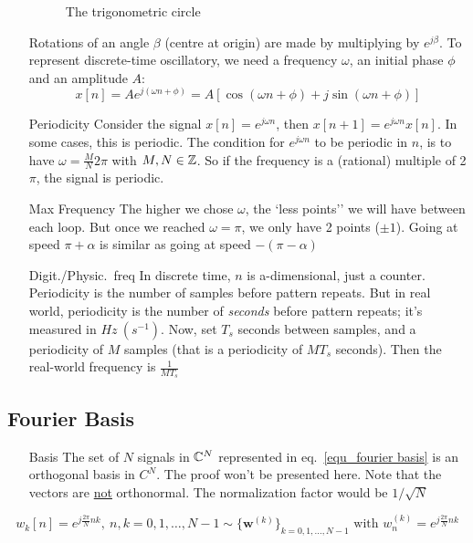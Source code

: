 \documentclass[11pt,a4paper]{article}
\begin{document}
\begin{itemize}
\begin{figure}
            \caption{The trigonometric circle}%
            \label{fig_trigo circle}
        \end{figure}
        Rotations of an angle $\beta$ (centre at origin) are made by multiplying by $e^{j\beta}$. To represent discrete-time oscillatory, we need a frequency $\omega$, an initial phase $\phi$ and an amplitude $A$:
        \[x[n] = Ae^{j(\omega n + \phi)} = A[\cos(\omega n + \phi) + j\sin(\omega n+ \phi)]\]
    \item[Periodicity] Consider the signal $x[n] = e^{j\omega n}$, then $x[n+1] = e^{j\omega n} x[n]$. In some cases, this is periodic. The condition for $e^{j\omega n}$ to be periodic in $n$, is to have $\omega = \frac{M}{N}2\pi$ with $M,N \in \mathbb{Z}$. So if the frequency is a (rational) multiple of 2$\pi$, the signal is periodic.
    \item[Max Frequency]The higher we chose $\omega$, the `less points'' we will have between each loop. But once we reached $\omega = \pi$, we only have 2 points ($\pm 1$). Going at speed $\pi+\alpha$ is similar as going at speed $-(\pi-\alpha)$
    \item[Digit./Physic.\ freq]In discrete time, $n$ is a-dimensional, just a counter. Periodicity is the number of samples before pattern repeats. But in real world, periodicity is the number of \textit{seconds} before pattern repeats; it's measured in $Hz\ (s^{-1})$. Now, set $T_s$ seconds between samples, and a periodicity of $M$ samples (that is a periodicity of $MT_s$ seconds). Then the real-world frequency is $\frac{1}{MT_s}$
\end{itemize}
\subsection{Fourier Basis}
\begin{itemize}
    \item[Basis]The set of $N$ signals in $\mathbb{C}^N$ represented in eq.~\ref{equ_fourier basis} is an orthogonal basis in $C^N$. The proof won't be presented here. Note that the vectors are \uline{not} orthonormal. The normalization factor would be $1/\sqrt{N}$
\end{itemize}        
\begin{equation}
    w_k[n] = e^{j\frac{2\pi}{N}nk},\ n,k = 0,1,\ldots,N-1 \sim \{\mathbf{w}^{(k)}\}_{k=0,1,\ldots,N-1} \text{ with } w_n^{(k)} = e^{j\frac{2\pi}{N}nk}
    \label{equ_fourier basis}
\end{equation}
\end{document}
